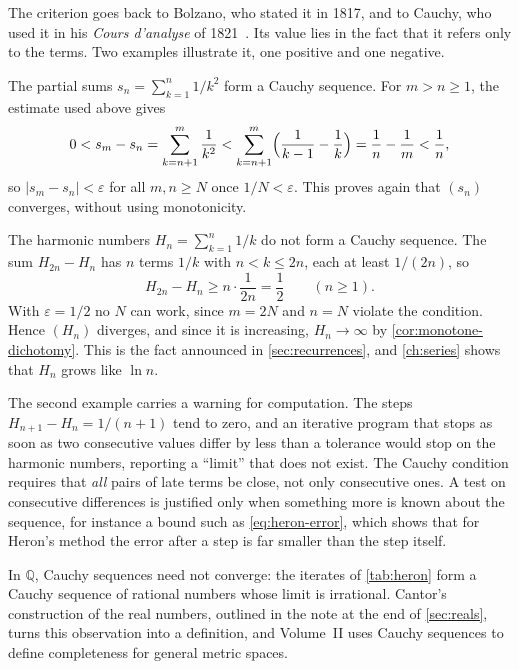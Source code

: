 The criterion goes back to Bolzano, who stated it in 1817, and to Cauchy, who used it in his \emph{Cours d'analyse} of 1821~\cite{russ1980,cauchy1821,grabiner1981}. Its value lies in the fact that it refers only to the terms. Two examples illustrate it, one positive and one negative.

The partial sums $s_n=\sum_{k=1}^n1/k^2$ form a Cauchy sequence. For $m>n\ge1$, the estimate used above gives
\[
0<s_m-s_n=\sum_{k=n+1}^m\frac1{k^2}<\sum_{k=n+1}^m\Bigl(\frac1{k-1}-\frac1k\Bigr)=\frac1n-\frac1m<\frac1n ,
\]
so $|s_m-s_n|<\varepsilon$ for all $m,n\ge N$ once $1/N<\varepsilon$. This proves again that $(s_n)$ converges, without using monotonicity.

The harmonic numbers $H_n=\sum_{k=1}^n1/k$ do not form a Cauchy sequence. The sum $H_{2n}-H_n$ has $n$ terms $1/k$ with $n<k\le2n$, each at least $1/(2n)$, so
\[
H_{2n}-H_n\ge n\cdot\frac1{2n}=\frac12\qquad(n\ge1).
\]
With $\varepsilon=1/2$ no $N$ can work, since $m=2N$ and $n=N$ violate the condition. Hence $(H_n)$ diverges, and since it is increasing, $H_n\to\infty$ by \cref{cor:monotone-dichotomy}. This is the fact announced in \cref{sec:recurrences}, and \cref{ch:series} shows that $H_n$ grows like $\ln n$.

The second example carries a warning for computation. The steps $H_{n+1}-H_n=1/(n+1)$ tend to zero, and an iterative program that stops as soon as two consecutive values differ by less than a tolerance would stop on the harmonic numbers, reporting a ``limit'' that does not exist. The Cauchy condition requires that \emph{all} pairs of late terms be close, not only consecutive ones. A test on consecutive differences is justified only when something more is known about the sequence, for instance a bound such as \eqref{eq:heron-error}, which shows that for Heron's method the error after a step is far smaller than the step itself.

In $\mathbb Q$, Cauchy sequences need not converge: the iterates of \cref{tab:heron} form a Cauchy sequence of rational numbers whose limit is irrational. Cantor's construction of the real numbers, outlined in the note at the end of \cref{sec:reals}, turns this observation into a definition, and Volume~II uses Cauchy sequences to define completeness for general metric spaces.

